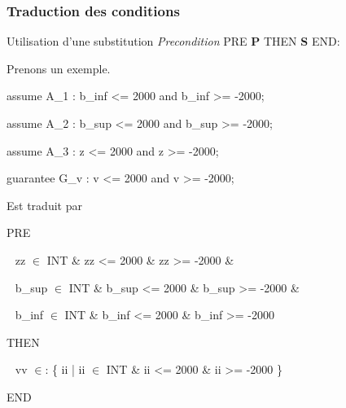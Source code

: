 \documentclass[10pt]{beamer}
\begin{document}
\begin{frame}

\frametitle{Traduction des conditions}
Utilisation d'une substitution \emph{Precondition} PRE \textbf{P} THEN
\textbf{S} END:
{

Prenons un exemple.
\begin{semiverbatim}
  assume A\_1 : b\_inf <= 2000 and b\_inf >= -2000;

  assume A\_2 : b\_sup <= 2000 and b\_sup >= -2000;

  assume A\_3 : z <= 2000 and z >= -2000;

  guarantee G\_v : v <= 2000 and v >= -2000;
\end{semiverbatim}
Est traduit par
\begin{semiverbatim}
 PRE

$~~$   zz $\in$ INT \& zz <= 2000 \& zz >= -2000 \&

$~~$   b\_sup $\in$ INT \& b\_sup <= 2000 \& b\_sup >= -2000 \&

$~~$   b\_inf $\in$ INT \& b\_inf <= 2000 \& b\_inf >= -2000

 THEN

$~~$   vv $\in$: \{ ii | ii $\in$ INT \& ii <= 2000 \& ii >= -2000 \}

 END 
\end{semiverbatim}
}
\pause[2]
 $~~$
\end{frame}
\end{document}
